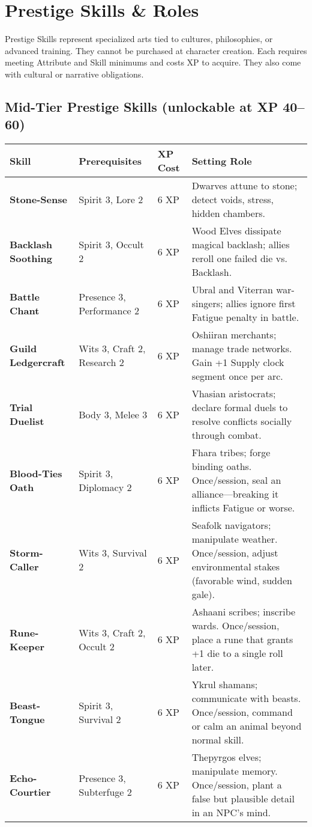 \documentclass[12pt]{article}
\begin{document}
\section{Prestige Skills \& Roles}

Prestige Skills represent specialized arts tied to cultures, philosophies, or advanced training. 
They cannot be purchased at character creation. 
Each requires meeting Attribute and Skill minimums and costs XP to acquire. 
They also come with cultural or narrative obligations.

\subsection*{Mid-Tier Prestige Skills (unlockable at XP 40--60)}

\begin{tabular}{@{}llll@{}}
\toprule
\textbf{Skill} & \textbf{Prerequisites} & \textbf{XP Cost} & \textbf{Setting Role} \\
\midrule
\textbf{Stone-Sense} & Spirit 3, Lore 2 & 6 XP & Dwarves attune to stone; detect voids, stress, hidden chambers. \\
\textbf{Backlash Soothing} & Spirit 3, Occult 2 & 6 XP & Wood Elves dissipate magical backlash; allies reroll one failed die vs. Backlash. \\
\textbf{Battle Chant} & Presence 3, Performance 2 & 6 XP & Ubral and Viterran war-singers; allies ignore first Fatigue penalty in battle. \\
\textbf{Guild Ledgercraft} & Wits 3, Craft 2, Research 2 & 6 XP & Oshiiran merchants; manage trade networks. Gain +1 Supply clock segment once per arc. \\
\textbf{Trial Duelist} & Body 3, Melee 3 & 6 XP & Vhasian aristocrats; declare formal duels to resolve conflicts socially through combat. \\
\textbf{Blood-Ties Oath} & Spirit 3, Diplomacy 2 & 6 XP & Fhara tribes; forge binding oaths. Once/session, seal an alliance—breaking it inflicts Fatigue or worse. \\
\textbf{Storm-Caller} & Wits 3, Survival 2 & 6 XP & Seafolk navigators; manipulate weather. Once/session, adjust environmental stakes (favorable wind, sudden gale). \\
\textbf{Rune-Keeper} & Wits 3, Craft 2, Occult 2 & 6 XP & Ashaani scribes; inscribe wards. Once/session, place a rune that grants +1 die to a single roll later. \\
\textbf{Beast-Tongue} & Spirit 3, Survival 2 & 6 XP & Ykrul shamans; communicate with beasts. Once/session, command or calm an animal beyond normal skill. \\
\textbf{Echo-Courtier} & Presence 3, Subterfuge 2 & 6 XP & Thepyrgos elves; manipulate memory. Once/session, plant a false but plausible detail in an NPC’s mind. \\
\bottomrule
\end{tabular}
\end{document}
